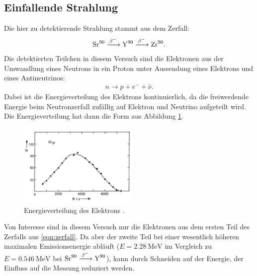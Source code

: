 \subsection{Einfallende Strahlung}

Die hier zu detektierende Strahlung stammt aus dem Zerfall:
\begin{align}
  \ce{Sr^{90} ->[$\beta^-$] Y^{90} ->[$\beta^-$] Zr^{90}}. \label{eqn:zerfall}
\end{align}
Die detektierten Teilchen in diesem Versuch sind die Elektronen aus der Umwandlung eines Neutrons in ein Proton unter Aussendung eines Elektrons und eines Antineutrinos:
\begin{align*}
  n \to p + e^- + \bar \nu.
\end{align*}
Dabei ist die Energieverteilung des Elektrons kontinuierlich, da die freiwerdende Energie beim Neutronzerfall zufällig auf Elektron und Neutrino aufgeteilt wird. Die Energieverteilung hat dann die Form aus Abbildung \ref{fig:elektronenergie}.
\begin{figure}
  \centering
  \includegraphics[height=4cm]{TimosAufrisse/elektronenenergie.png}
  \caption{Energieverteilung des Elektrons \cite{anleitung}.}
  \label{fig:elektronenergie}
\end{figure}
Von Interesse sind in diesem Versuch nur die Elektronen aus dem ersten Teil des Zerfalls aus \eqref{eqn:zerfall}. Da aber der zweite
Teil bei einer wesentlich höheren maximalen Emissionsenergie abläuft ($E = \SI{2.28}{\mega\electronvolt}$ im Vergleich zu $E = \SI{0.546}{\mega\electronvolt}$ bei
$\ce{Sr^{90} ->[$\beta^-$] Y^{90}}$), kann durch Schneiden auf der Energie, der Einfluss auf die Messung reduziert werden.


